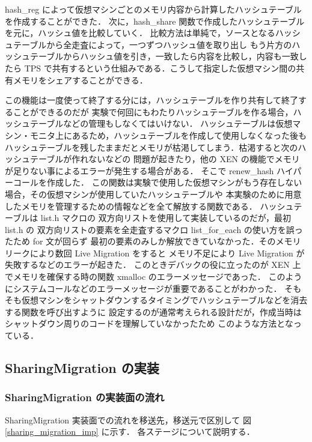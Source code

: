 \documentclass[graduation-thesis]{mlarticle}
\begin{document}
hash\_reg によって仮想マシンごとのメモリ内容から計算したハッシュテーブルを作成することができた．
次に，hash\_share 関数で作成したハッシュテーブルを元に，ハッシュ値を比較していく．
比較方法は単純で，ソースとなるハッシュテーブルから全走査によって，一つずつハッシュ値を取り出し
もう片方のハッシュテーブルからハッシュ値を引き，一致したら内容を比較し，内容も一致したら
TPS で共有するという仕組みである．こうして指定した仮想マシン間の共有メモリをシェアすることができる．

この機能は一度使って終了する分には，ハッシュテーブルを作り共有して終了することができるのだが
実験で何回にもわたりハッシュテーブルを作る場合，ハッシュテーブルなどの管理もしなくてはいけない．
ハッシュテーブルは仮想マシン・モニタ上にあるため，ハッシュテーブルを作成して使用しなくなった後も
ハッシュテーブルを残したままだとメモリが枯渇してしまう．枯渇すると次のハッシュテーブルが作れないなどの
問題が起きたり，他の XEN の機能でメモリが足りない事によるエラーが発生する場合がある．
そこで renew\_hash ハイパーコールを作成した．
この関数は実験で使用した仮想マシンがもう存在しない場合，その仮想マシンが使用していたハッシュテーブルや
本実験のために用意したメモリを管理するための情報などを全て解放する関数である．
ハッシュテーブルは list.h マクロの 双方向リストを使用して実装しているのだが，最初 list.h の
双方向リストの要素を全走査するマクロ list\_for\_each の使い方を誤ったため for 文が回らず
最初の要素のみしか解放できていなかった．そのメモリリークにより数回 Live Migration をすると
メモリ不足により Live Migration が失敗するなどのエラーが起きた．
このときデバックの役に立ったのが XEN 上でメモリを確保する時の関数 xmalloc のエラーメッセージであった．
このようにシステムコールなどのエラーメッセージが重要であることがわかった．
そもそも仮想マシンをシャットダウンするタイミングでハッシュテーブルなどを消去する関数を呼び出すように
設定するのが通常考えられる設計だが，作成当時はシャットダウン周りのコードを理解していなかったため
このような方法となっている．

\subsection{SharingMigration の実装}
\label{sec-5-3}
\subsubsection{SharingMigration の実装面の流れ}
\label{sec-5-3-1}
SharingMigration 実装面での流れを移送先，移送元で区別して
図 \ref{sharing_migration_imp} に示す．
各ステージについて説明する．
\end{document}
